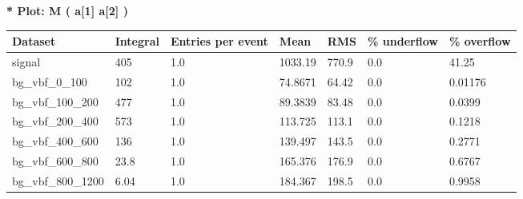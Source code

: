 \documentclass[a4paper, 10pt]{article}
\begin{document}
\textbf{* Plot: M ( a[1] a[2] ) }\\
   \begin{table}[H]
  \begin{center}
    \begin{tabular}{|m{23.0mm}|m{23.0mm}|m{18.0mm}|m{19.0mm}|m{19.0mm}|m{19.0mm}|m{19.0mm}|}
      \hline
      {\cellcolor{yellow}         Dataset}& {\cellcolor{yellow}         Integral}& {\cellcolor{yellow}         Entries per event}& {\cellcolor{yellow}         Mean}& {\cellcolor{yellow}         RMS}& {\cellcolor{yellow}         \% underflow}& {\cellcolor{yellow}         \% overflow}\\
      \hline
      {\cellcolor{white}         signal}& {\cellcolor{white}         405}& {\cellcolor{white}         1.0}& {\cellcolor{white}         1033.19}& {\cellcolor{white}         770.9}& {\cellcolor{red}         0.0}& {\cellcolor{red}         41.25}\\
      \hline
      {\cellcolor{white}         bg\_vbf\_0\_100}& {\cellcolor{white}         102}& {\cellcolor{white}         1.0}& {\cellcolor{white}         74.8671}& {\cellcolor{white}         64.42}& {\cellcolor{green}         0.0}& {\cellcolor{green}         0.01176}\\
      \hline
      {\cellcolor{white}         bg\_vbf\_100\_200}& {\cellcolor{white}         477}& {\cellcolor{white}         1.0}& {\cellcolor{white}         89.3839}& {\cellcolor{white}         83.48}& {\cellcolor{green}         0.0}& {\cellcolor{green}         0.0399}\\
      \hline
      {\cellcolor{white}         bg\_vbf\_200\_400}& {\cellcolor{white}         573}& {\cellcolor{white}         1.0}& {\cellcolor{white}         113.725}& {\cellcolor{white}         113.1}& {\cellcolor{green}         0.0}& {\cellcolor{green}         0.1218}\\
      \hline
      {\cellcolor{white}         bg\_vbf\_400\_600}& {\cellcolor{white}         136}& {\cellcolor{white}         1.0}& {\cellcolor{white}         139.497}& {\cellcolor{white}         143.5}& {\cellcolor{green}         0.0}& {\cellcolor{green}         0.2771}\\
      \hline
      {\cellcolor{white}         bg\_vbf\_600\_800}& {\cellcolor{white}         23.8}& {\cellcolor{white}         1.0}& {\cellcolor{white}         165.376}& {\cellcolor{white}         176.9}& {\cellcolor{green}         0.0}& {\cellcolor{green}         0.6767}\\
      \hline
      {\cellcolor{white}         bg\_vbf\_800\_1200}& {\cellcolor{white}         6.04}& {\cellcolor{white}         1.0}& {\cellcolor{white}         184.367}& {\cellcolor{white}         198.5}& {\cellcolor{green}         0.0}& {\cellcolor{green}         0.9958}\\

\end{tabular}
\end{center}
\end{table}
\end{document}
